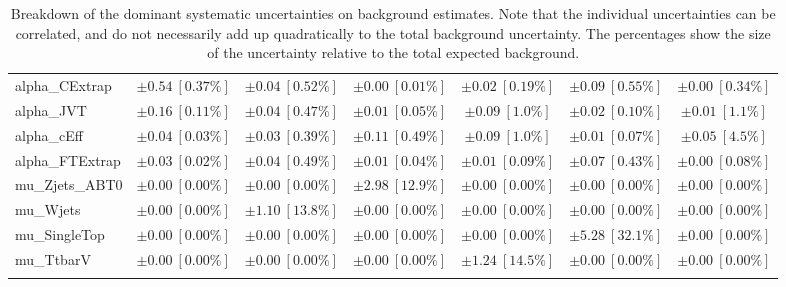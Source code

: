 \begin{sidewaystable}
\begin{center}
\begin{tabular*}{\textwidth}{@{\extracolsep{\fill}}lcccccc}
alpha\_CExtrap         & $\pm 0.54\ [0.37\%] $          & $\pm 0.04\ [0.52\%] $          & $\pm 0.00\ [0.01\%] $          & $\pm 0.02\ [0.19\%] $          & $\pm 0.09\ [0.55\%] $          & $\pm 0.00\ [0.34\%] $       \\
alpha\_JVT         & $\pm 0.16\ [0.11\%] $          & $\pm 0.04\ [0.47\%] $          & $\pm 0.01\ [0.05\%] $          & $\pm 0.09\ [1.0\%] $          & $\pm 0.02\ [0.10\%] $          & $\pm 0.01\ [1.1\%] $       \\
alpha\_cEff         & $\pm 0.04\ [0.03\%] $          & $\pm 0.03\ [0.39\%] $          & $\pm 0.11\ [0.49\%] $          & $\pm 0.09\ [1.0\%] $          & $\pm 0.01\ [0.07\%] $          & $\pm 0.05\ [4.5\%] $       \\
alpha\_FTExtrap         & $\pm 0.03\ [0.02\%] $          & $\pm 0.04\ [0.49\%] $          & $\pm 0.01\ [0.04\%] $          & $\pm 0.01\ [0.09\%] $          & $\pm 0.07\ [0.43\%] $          & $\pm 0.00\ [0.08\%] $       \\
mu\_Zjets\_ABT0         & $\pm 0.00\ [0.00\%] $          & $\pm 0.00\ [0.00\%] $          & $\pm 2.98\ [12.9\%] $          & $\pm 0.00\ [0.00\%] $          & $\pm 0.00\ [0.00\%] $          & $\pm 0.00\ [0.00\%] $       \\
mu\_Wjets         & $\pm 0.00\ [0.00\%] $          & $\pm 1.10\ [13.8\%] $          & $\pm 0.00\ [0.00\%] $          & $\pm 0.00\ [0.00\%] $          & $\pm 0.00\ [0.00\%] $          & $\pm 0.00\ [0.00\%] $       \\
mu\_SingleTop         & $\pm 0.00\ [0.00\%] $          & $\pm 0.00\ [0.00\%] $          & $\pm 0.00\ [0.00\%] $          & $\pm 0.00\ [0.00\%] $          & $\pm 5.28\ [32.1\%] $          & $\pm 0.00\ [0.00\%] $       \\
mu\_TtbarV         & $\pm 0.00\ [0.00\%] $          & $\pm 0.00\ [0.00\%] $          & $\pm 0.00\ [0.00\%] $          & $\pm 1.24\ [14.5\%] $          & $\pm 0.00\ [0.00\%] $          & $\pm 0.00\ [0.00\%] $       \\
\noalign{\smallskip}\hline\noalign{\smallskip}
\end{tabular*}
\end{center}
\caption[Breakdown of uncertainty on background estimates]{
Breakdown of the dominant systematic uncertainties on background estimates.
Note that the individual uncertainties can be correlated, and do not necessarily add up quadratically to 
the total background uncertainty. The percentages show the size of the uncertainty relative to the total expected background.
\label{table.results.bkgestimate.uncertainties.VRTopBT0_bybkg}}
\end{sidewaystable}
%